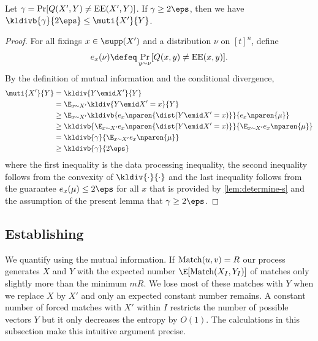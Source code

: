 \begin{lemma}
\label{lem:kl-err}
Let $\gamma = \Pr[Q(X',Y)\neq \operatorname{EE}(X',Y)]$. 
If $\gamma \ge 2\eps$, then we have $\kldivb{\gamma}{2\eps}\le \muti{X'}{Y}$.
\end{lemma}
\begin{proof}
For all fixings $x\in\supp(X')$ and a distribution $\nu$
on $[t]^n$, define 
\begin{align*}
e_{x}(\nu) \defeq \Pr_{y\sim \nu}[Q(x, y)\neq\EE(x, y)].
\end{align*}
By the definition of mutual information and the conditional divergence, 
\begin{align*}
\muti{X'}{Y}
    &=   \kldiv{Y\emid X'}{Y}\\
    &=   \E_{x\sim X'}\kldiv{Y\emid X'=x}{Y}\\
    &\ge \E_{x\sim X'}
         \kldivb{e_x\nparen{\dist(Y\emid X'=x)}}
                         {e_x\nparen{\mu}}\\
    &\ge \kldivb{\E_{x\sim X'}e_x\nparen{\dist(Y\emid X'=x)}}
                         {\E_{x\sim X'}e_x\nparen{\mu}}\\
    &= \kldivb{\gamma}{\E_{x\sim X'}e_x\nparen{\mu}}\\
    &\ge \kldivb{\gamma}{2\eps}
\end{align*}
where the first inequality is the data processing inequality,
the second inequality follows from the convexity of $\kldiv{\cdot}{\cdot}$
and the last inequality follows from 
the guarantee $e_x(\mu)\le 2\eps$ 
for all $x$ that is provided by \autoref{lem:determine-s}
and the assumption of the present lemma that $\gamma\ge 2\eps$.
\end{proof}

\subsection{Establishing }

We quantify  using the mutual information. 
If $\operatorname{Match}(u,v)=R$ our process generates $X$
and $Y$ with the expected number $\E[\Match(X_I,Y_I)]$ of
matches only slightly more than the minimum $mR$. We lose most
of these matches with $Y$ when we replace $X$ by $X'$ and only
an expected constant number remains. A constant number of forced
matches with $X'$ within $I$ restricts the number of possible
vectors $Y$ but it only decreases the entropy by $O(1)$. The
calculations in this subsection make this intuitive argument
precise.


